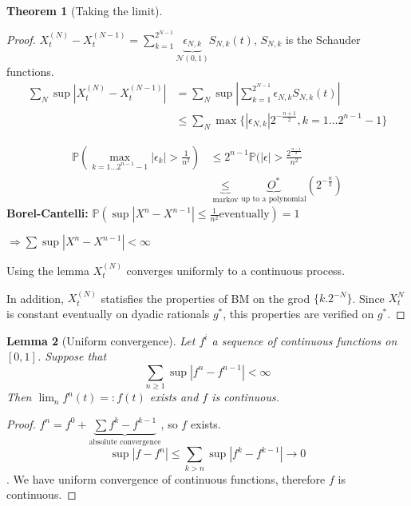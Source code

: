 \documentclass{article}
\newtheorem{theorem}{Theorem}
\newtheorem{lemma}[theorem]{Lemma}
\begin{document}
\begin{theorem}[Taking the limit]

\end{theorem}
\begin{proof}
  $X_t^{(N)} - X_t^{(N-1)} = \sum_{k = 1}^{2^{N-1}} \underbrace{\epsilon_{N,k}}_{\mathcal N(0, 1)} S_{N, k}(t)$, $S_{N, k}$ is the Schauder functions.
  \begin{align*}
    \sum_N \sup |X_t^{(N)} - X_t^{(N-1)}|
  &= \sum_N \sup |\sum_{k = 1}^{2^{N-1}} \epsilon_{N,k} S_{N, k}(t)|
    \\&\le \sum_N  \max \{ |\epsilon_{N,k}| 2^{-\frac{n+1}{2}}, k=1\ldots2^{n-1}-1 \}
  \end{align*}

  \begin{align*}
    \mathbb{P}(\max_{k=1\ldots2^{n-1}-1} |\epsilon_k| > \frac{1}{n^2})
    &\le 2^{n-1} \mathbb{P}(|\epsilon| > \frac{2^{\frac{n-1}2}}{n^2}
    \\& \underbrace{\le}_{\text{markov}} \underbrace{O^*}_{\text{up to a polynomial}}(2^{-\frac n2})
  \end{align*}
  \textbf{Borel-Cantelli:} $\mathbb P( \sup |X^n - X^{n-1}| \le \frac1 {n^2} \text{eventually}) = 1$
  
  $\Rightarrow \sum \sup |X^n - X^{n-1}| < \infty$
  
    Using the lemma $X_t^{(N)}$ converges uniformly to a continuous process.
  
  In addition, $X_t^{(N)}$ statisfies the properties of BM on the grod $\{ k. 2^{-N} \}$. Since $X_t^N$ is constant eventually on dyadic rationals $g^*$, this properties are verified on $g^*$.
\end{proof}

\begin{lemma}[Uniform convergence]
  Let $f^{i}$ a sequence of continuous functions on $[0, 1]$.
  Suppose that $$ \sum_{n \ge 1 } \sup |f^{n} - f^{n-1}| < \infty$$
  Then $\lim_n f^{n}(t) =: f(t)$ exists and $f$ is continuous.
\end{lemma}
\begin{proof}
  $f^{n} = f^{0} + \underbrace{\sum f^k - f^{k-1}}_{\text{absolute convergence}}$, so $f$ exists.
  $$\sup |f - f^n| \le \sum_{k > n} \sup |f^k - f^{k-1}| \rightarrow 0$$.
  We have uniform convergence of continuous functions, therefore $f$ is continuous.
\end{proof}
\end{document}

